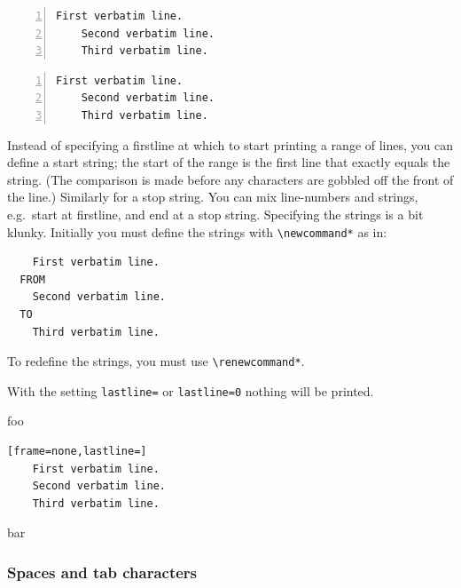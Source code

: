 \documentclass[twoside]{article}
\newcommand\cs[1]{\texttt{\textbackslash#1}}
\begin{document}
\begin{SideBySideExample}
  \begin{Verbatim}[gobble=2,firstline=2,
         numbers=left,numbersep=2pt]
    First verbatim line.
    Second verbatim line.
    Third verbatim line.
  \end{Verbatim}
\end{SideBySideExample}


\begin{SideBySideExample}
  \begin{Verbatim}[gobble=2,lastline=1,
         numbers=left,numbersep=2pt]
    First verbatim line.
    Second verbatim line.
    Third verbatim line.
  \end{Verbatim}
\end{SideBySideExample}

Instead of specifying a firstline at which to start printing a range
of lines, you can define a start string; the start of the range is
the first line that exactly equals the string.  (The comparison is made
before any characters are gobbled off the front of the line.) Similarly for a stop
string. You can mix line-numbers and strings, e.g.\ start at
firstline, and end at a stop string.  Specifying the strings is a
bit klunky.  Initially you must define the strings with
\cs{newcommand*} as in:

\begin{SideBySideExample}[gobble=2]
  \newcommand*\FancyVerbStartString{FROM}
  \newcommand*\FancyVerbStopString{TO}
  \begin{Verbatim}
    First verbatim line.
  FROM
    Second verbatim line.
  TO
    Third verbatim line.
  \end{Verbatim}
\end{SideBySideExample}

\noindent To redefine the strings, you must use \cs{renewcommand*}.

With the setting \texttt{lastline=} or \texttt{lastline=0} nothing will be printed.

\begin{SideBySideExample}[gobble=2]
  foo
  \begin{Verbatim}[frame=none,lastline=]
    First verbatim line.
    Second verbatim line.
    Third verbatim line.
  \end{Verbatim}
  bar
\end{SideBySideExample}

\subsubsection{Spaces and tab characters}
\end{document}
